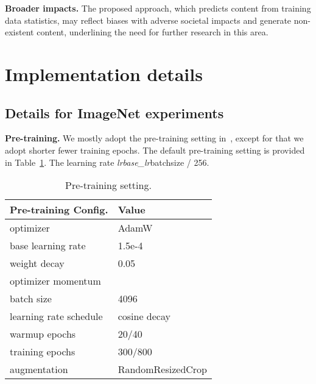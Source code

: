 \documentclass{article}
\begin{document}
\textbf{Broader impacts.} 
The proposed approach, which predicts content from training data statistics, may reflect biases with adverse societal impacts and generate non-existent content, underlining the need for further research in this area.



{
\small


}


\appendix

\section{Implementation details}
\subsection{Details for ImageNet experiments}
\label{sec: details_imagenet}

\textbf{Pre-training.}
We mostly adopt the pre-training setting in~\cite{he2022masked}, except for that we adopt shorter fewer training epochs.
The default pre-training setting is provided in Table~\ref{tab: impl_pre_train}. The learning rate \textit{lr}\textit{base\_lr}batchsize / 256.
\begin{table}[htbp]
\small
\renewcommand{\arraystretch}{1.1}
\setlength{\tabcolsep}{20pt}
\begin{tabular}{@{}l  l@{}}
\toprule
Pre-training Config. & Value \\
\midrule
optimizer & AdamW \\
base learning rate & 1.5e-4 \\
weight decay & 0.05 \\
optimizer momentum &  \\
batch size & 4096 \\
learning rate schedule & cosine decay \\
warmup epochs & 20/40 \\
training epochs & 300/800 \\
augmentation & RandomResizedCrop \\
\bottomrule
\end{tabular}
\caption{Pre-training setting.}
\label{tab: impl_pre_train}
\end{table}
\end{document}
